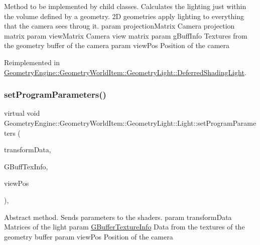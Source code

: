 Method to be implemented by child classes. Calculates the lighting just within the volume defined by a geometry. 2D geometries apply lighting to everything that the camera sees throug it. param projection\+Matrix Camera projection matrix param view\+Matrix Camera view matrix param g\+Buff\+Info Textures from the geometry buffer of the camera param view\+Pos Position of the camera 

Reimplemented in \mbox{\hyperlink{class_geometry_engine_1_1_geometry_world_item_1_1_geometry_light_1_1_deferred_shading_light_a2071d92505a56dfb846b87c2aca9b94b}{Geometry\+Engine\+::\+Geometry\+World\+Item\+::\+Geometry\+Light\+::\+Deferred\+Shading\+Light}}.

\mbox{\label{class_geometry_engine_1_1_geometry_world_item_1_1_geometry_light_1_1_light_a366be5945389fe58df4bf5aa8c43138f}} 
\subsubsection{\texorpdfstring{setProgramParameters()}{setProgramParameters()}}
{\footnotesize\ttfamily virtual void Geometry\+Engine\+::\+Geometry\+World\+Item\+::\+Geometry\+Light\+::\+Light\+::set\+Program\+Parameters (\begin{DoxyParamCaption}\item[{const \mbox{\hyperlink{struct_geometry_engine_1_1_lighting_transformation_data}{Lighting\+Transformation\+Data}} \&}]{transform\+Data,  }\item[{const \mbox{\hyperlink{struct_geometry_engine_1_1_g_buffer_texture_info}{G\+Buffer\+Texture\+Info}} \&}]{G\+Buff\+Tex\+Info,  }\item[{const Q\+Vector3D \&}]{view\+Pos }\end{DoxyParamCaption})\hspace{0.3cm}{\ttfamily [protected]}, {}}

Abstract method. Sends parameters to the shaders. param transform\+Data Matrices of the light param \mbox{\hyperlink{struct_geometry_engine_1_1_g_buffer_texture_info}{G\+Buffer\+Texture\+Info}} Data from the textures of the geometry buffer param view\+Pos Position of the camera 

